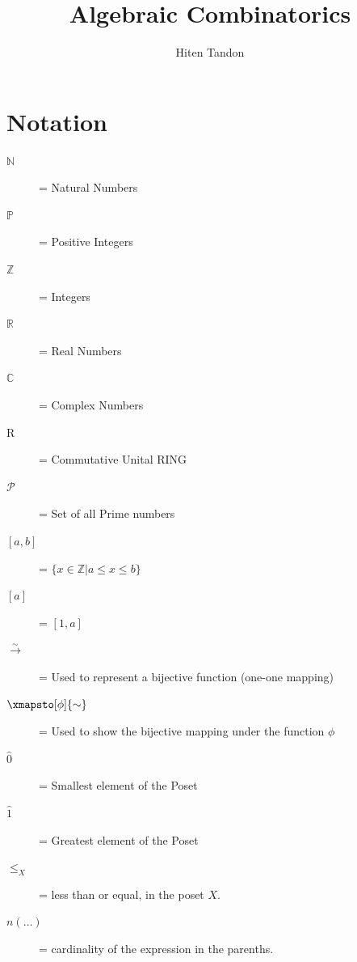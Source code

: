 \documentclass[5pt]{book}
\title{Algebraic Combinatorics}
\author{Hiten Tandon}
\date{}
\newcommand{\bN}{\mathbb{N}}
\newcommand{\bP}{\mathbb{P}}
\newcommand{\bZ}{\mathbb{Z}}
\newcommand{\bR}{\mathbb{R}}
\newcommand{\bC}{\mathbb{C}}
\newcommand{\cP}{\mathcal{P}}
\newcommand{\bijection}{\xrightarrow{\sim}}
\newcommand{\bijectivemap}[1]{\xmapsto[#1]{\sim}}
\begin{document}
\maketitle
\section{Notation}

\begin{description}
  \item[$\bN$]= Natural Numbers
  \item[$\bP$]= Positive Integers
  \item[$\bZ$]= Integers
  \item[$\bR$]= Real Numbers
  \item[$\bC$]= Complex Numbers
  \item[R]= Commutative Unital RING
  \item[$\cP$]= Set of all Prime numbers
  \item[{$[a, b]$}]= $\{x \in \bZ \left| a \le x \le b\right.\}$
  \item[{$[a]$}]= $[1, a]$
  \item[{$\bijection$}]= Used to represent a bijective function
    (one-one mapping)
  \item[{$\bijectivemap\phi$}]= Used to show the bijective mapping
    under the function $\phi$
  \item[$\hat0$]= Smallest element of the Poset
  \item[$\hat1$]= Greatest element of the Poset
  \item[$\le_X$]= less than or equal, in the poset $X$.
  \item[$n(\dots)$]= cardinality of the expression in the parenths.
\end{description}



\end{document}
